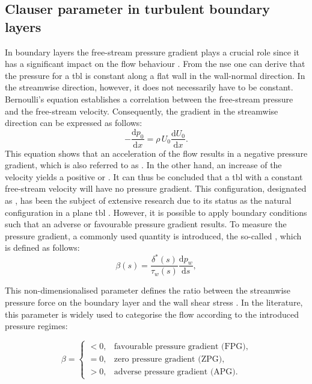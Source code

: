 \subsection{Clauser parameter in turbulent boundary layers}

In boundary layers the free-stream pressure gradient plays a crucial role since it has a significant impact on the flow behaviour \citep{clauser_turbulent_1954}.
From the \acrshort{nse} one can derive that the pressure for a \acrshort{tbl} is constant along a flat wall in the wall-normal direction.
In the streamwise direction, however, it does not necessarily have to be constant.
Bernoulli's equation establishes a correlation between the free-stream pressure and the free-stream velocity. Consequently, the gradient in the streamwise direction can be expressed as follows:
\begin{equation}\label{eq:bernoulli}
    -\frac{\mathrm{d}p_0}{\mathrm{d}x} = \rho\, U_0 \frac{\mathrm{d}U_0}{\mathrm{d}x}.
\end{equation}
This equation shows that an acceleration of the flow results in a negative pressure gradient, which is also referred to as . 
In the other hand, an increase of the velocity yields a positive or . 
It can thus be concluded that a \acrshort{tbl} with a constant free-stream velocity will have no pressure gradient.
This configuration, designated as , has been the subject of extensive research due to its status as the natural configuration in a plane \acrshort{tbl} \citep{spalart_direct_2024,schlatter_assessment_2010}.
However, it is possible to apply boundary conditions such that an adverse or favourable pressure gradient results.
To measure the pressure gradient, a commonly used quantity is introduced,  the so-called , which is defined as follows:
\begin{equation}\label{eq:beta}
    \beta(s) = \frac{\delta^*(s)}{\tau_w(s)} \frac{\mathrm{d}p_w}{\mathrm{d}s},
\end{equation}

This non-dimensionalised parameter defines the ratio between the streamwise pressure force on the boundary layer and the wall shear stress \citep{clauser_turbulent_1954}.
In the literature, this parameter is widely used to categorise the flow according to the introduced pressure regimes:

\begin{equation}
    \beta =
    \begin{cases}
        < 0, & \text{favourable pressure gradient (FPG)}, \\
        = 0, & \text{zero pressure gradient (ZPG)}, \\
        > 0, & \text{adverse pressure gradient (APG)}.
    \end{cases}
\end{equation}




